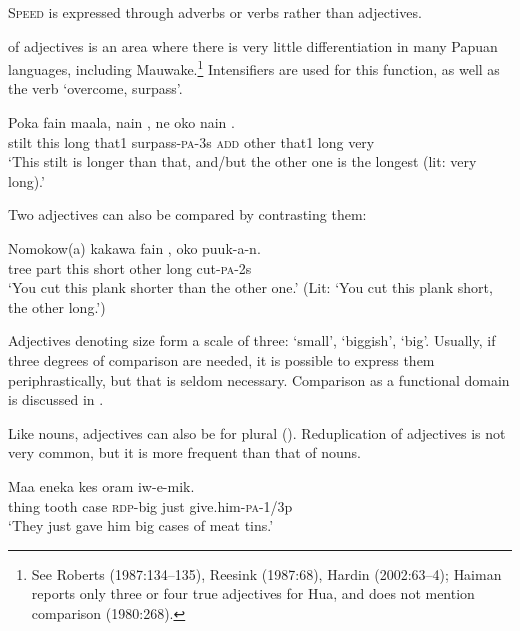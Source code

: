 \textsc{Speed} is expressed through adverbs or verbs rather than adjectives.

 of adjectives is an area where there is very little differentiation in many Papuan languages, including Mauwake.\footnote{See {Roberts} (1987:134--135), {Reesink} (1987:68), {Hardin} (2002:63--4); {Haiman} reports only three or four true adjectives for Hua, and does not mention comparison (1980:268).} Intensifiers are used for this function, as well as the verb \textstyleEmphasizedVernacularWords{-} `overcome, surpass'. 

\ea%
\label{ex:x81}
\gll Poka fain maala, nain , ne oko nain  .\\
stilt this long that1 surpass-\textsc{pa}-3s \textsc{add} other that1 long very\\
\glt`This stilt is longer than that, and/but the other one is the longest (lit: very long).'
\z

Two adjectives can also be compared by contrasting them: 

\ea%
\label{ex:x441}
\gll Nomokow(a) kakawa fain , oko  puuk-a-n. \\
tree part this short other long cut-\textsc{pa}-2s\\
\glt`You cut this plank shorter than the other one.' (Lit: `You cut this plank short, the other long.')
\z

Adjectives denoting size form a scale of three:  `small',  `biggish',  `big'. Usually, if three degrees of comparison are needed, it is possible to express them periphrastically, but that is seldom necessary. Comparison as a functional domain is discussed in . 

Like nouns, adjectives can also be  for plural (). Reduplication of adjectives is not very common, but it is more frequent than that of nouns. 

\ea%
\label{ex:x85}
\gll Maa eneka kes  oram iw-e-mik. \\
thing tooth case \textsc{rdp}-big just give.him-\textsc{pa}-1/3p\\
\glt`They just gave him big cases of meat tins.'
\z

